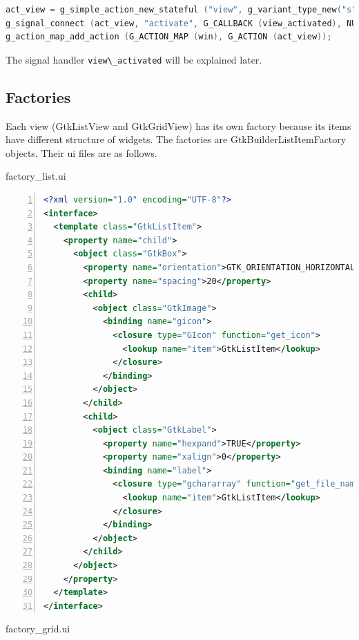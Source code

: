 \begin{lstlisting}[language=C]
act_view = g_simple_action_new_stateful ("view", g_variant_type_new("s"), g_variant_new_string ("list"));
g_signal_connect (act_view, "activate", G_CALLBACK (view_activated), NULL);
g_action_map_add_action (G_ACTION_MAP (win), G_ACTION (act_view));
\end{lstlisting}

The signal handler \passthrough{\lstinline!view\_activated!} will be
explained later.

\subsection{Factories}\label{factories}

Each view (GtkListView and GtkGridView) has its own factory because its
items have different structure of widgets. The factories are
GtkBuilderListItemFactory objects. Their ui files are as follows.

factory\_list.ui

\begin{lstlisting}[language=XML, numbers=left]
<?xml version="1.0" encoding="UTF-8"?>
<interface>
  <template class="GtkListItem">
    <property name="child">
      <object class="GtkBox">
        <property name="orientation">GTK_ORIENTATION_HORIZONTAL</property>
        <property name="spacing">20</property>
        <child>
          <object class="GtkImage">
            <binding name="gicon">
              <closure type="GIcon" function="get_icon">
                <lookup name="item">GtkListItem</lookup>
              </closure>
            </binding>
          </object>
        </child>
        <child>
          <object class="GtkLabel">
            <property name="hexpand">TRUE</property>
            <property name="xalign">0</property>
            <binding name="label">
              <closure type="gchararray" function="get_file_name">
                <lookup name="item">GtkListItem</lookup>
              </closure>
            </binding>
          </object>
        </child>
      </object>
    </property>
  </template>
</interface>
\end{lstlisting}

factory\_grid.ui

